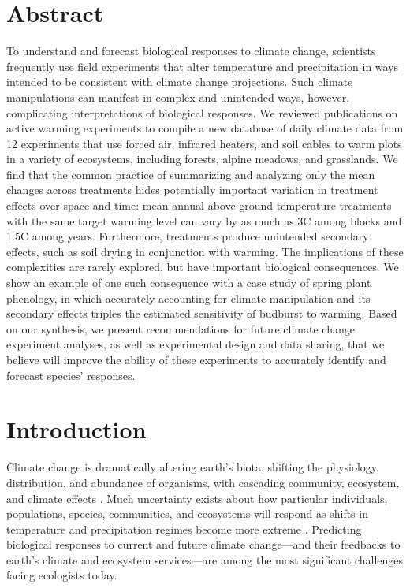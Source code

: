 \documentclass{article}
\begin{document}
\section* {Abstract} 
\par To understand and forecast biological responses to climate change, scientists frequently use field experiments that alter temperature and precipitation in ways intended to be consistent with climate change projections. Such climate manipulations can manifest in complex and unintended ways, however, complicating interpretations of biological responses. We reviewed publications on active warming experiments to compile a new database of daily climate data from 12 experiments that use forced air, infrared heaters, and soil cables to warm plots in a variety of ecosystems, including forests, alpine meadows, and grasslands.
We find that the common practice of summarizing and analyzing only the mean changes across treatments hides potentially important variation in treatment effects over space and time: mean annual above-ground temperature treatments with the same target warming level can vary by as much as 3\degree C among blocks and 1.5\degree C among years.  %
 Furthermore, treatments produce unintended secondary effects, such as soil drying in conjunction with warming. The implications of these complexities are rarely explored, but have important biological consequences. We show an example of one such consequence with a case study of spring plant phenology, in which accurately accounting for climate manipulation and its secondary effects triples the estimated sensitivity of budburst to warming. Based on our synthesis, we present recommendations for future climate change experiment analyses, as well as experimental design and data sharing, that we believe will improve the ability of these experiments to accurately identify and forecast species' responses.
\section* {Introduction}
\par Climate change is dramatically altering earth's biota, shifting the physiology, distribution, and abundance of organisms, with cascading community, ecosystem, and climate effects \citep{shukla1982,cox2000,thomas2004,parmesan2006,field2007,sheldon2011,urban2012}. Much uncertainty exists about how particular individuals, populations, species, communities, and ecosystems will respond as shifts in temperature and precipitation regimes become more extreme \citep{thuiller2004,friedlingstein2014}.
Predicting biological responses to current and future climate change---and their feedbacks to earth's climate and ecosystem services---are among the most significant challenges facing ecologists today.
\end{document}
